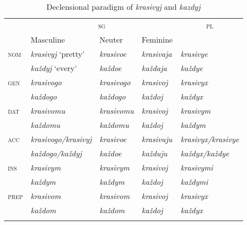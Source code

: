 \documentclass[output=paper,
colorlinks,
citecolor=brown,
newtxmath
]{langscibook}
\begin{document}
\begin{table}\caption{Declensional paradigm of \textit{krasivyj} and \textit{kazdyj}}\label{tab:2_kazdyj}
\begin{tabular}{>{\scshape}lllll}
\lsptoprule
&                   \multicolumn{3}{c}{\textsc{sg}}             & \multicolumn{1}{c}{\textsc{pl}}\\\cmidrule(lr){2-4}
&                   Masculine                   & Neuter                & Feminine              &\\
\midrule
nom&     \textit{krasivyj} `pretty'   & \textit{krasivoe}     & \textit{krasivaja}     & \textit{krasivye}\\ 
&               \textit{každyj} `every'      & \textit{každoe}       & \textit{každaja}       & \textit{každye}\\ 
\midrule
gen&       \textit{krasivogo}           & \textit{krasivogo}     & \textit{krasivoj}      & \textit{krasivyx}\\
&               \textit{každogo}             & \textit{každogo}       & \textit{každoj}        & \textit{každyx}\\ 
\midrule
dat&         \textit{krasivomu}           & \textit{krasivomu}     & \textit{krasivoj}      & \textit{krasivym}\\ 
&               \textit{každomu}             & \textit{každomu}       & \textit{každoj}        & \textit{každym}\\
\midrule
acc&     \textit{krasivogo/krasivyj}  & \textit{krasivoe}      & \textit{krasivuju}     & \textit{krasivyx/krasivye}\\
&               \textit{každogo/každyj}      & \textit{každoe}        & \textit{každuju}       & \textit{každyx/každye}\\
\midrule
ins&   \textit{krasivym}            & \textit{krasivym}      & \textit{krasivoj}      & \textit{krasivymi}\\
&               \textit{každym}              & \textit{každym}        & \textit{každoj}        & \textit{každymi}\\
\midrule
prep&  \textit{krasivom}            & \textit{krasivom}      & \textit{krasivoj}      & \textit{krasivyx}\\
&               \textit{každom}              & \textit{každom}        & \textit{každoj}        & \textit{každyx}\\
\lspbottomrule
\end{tabular}
\end{table}
\end{document}
